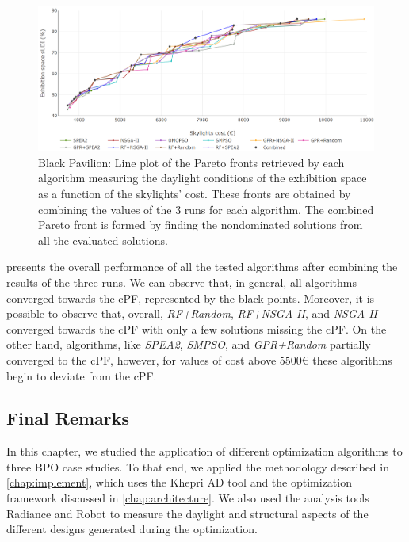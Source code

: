 \begin{figure}[htbp]
	\centering
	\includegraphics[width=\textwidth]{Images/Evaluation/BlackPavilion/All_Algorithms_all_runs-2019-04-16.png}
	\caption[Black Pavilion: Pareto front plot]{Black Pavilion: Line plot of the Pareto fronts retrieved by each algorithm measuring the daylight conditions of the exhibition space as a function of the skylights' cost. These fronts are obtained by combining the values of the $3$ runs for each algorithm. The combined Pareto front is formed by finding the nondominated solutions from all the evaluated solutions.}
	\label{fig:blackpavilionallruns}
\end{figure}

 presents the overall performance of all the tested algorithms after combining the results of the three runs. We can observe that, in general, all algorithms converged towards the \ac{cPF}, represented by the black points. Moreover, it is possible to observe that, overall, \textit{RF+Random}, \textit{RF+NSGA-II}, and \textit{NSGA-II} converged towards the \ac{cPF} with only a few solutions missing the \ac{cPF}. On the other hand, algorithms, like \textit{SPEA2}, \textit{SMPSO}, and \textit{GPR+Random} partially converged to the \ac{cPF}, however, for values of cost above $5500$€ these algorithms begin to deviate from the \ac{cPF}.

\subsection{Final Remarks}

In this chapter, we studied the application of different optimization algorithms to three \ac{BPO} case studies. To that end, we applied the methodology described in \cref{chap:implement}, which uses the Khepri \ac{AD} tool and the optimization framework discussed in \cref{chap:architecture}. We also used the analysis tools Radiance and Robot to measure the daylight and structural aspects of the different designs generated during the optimization.

